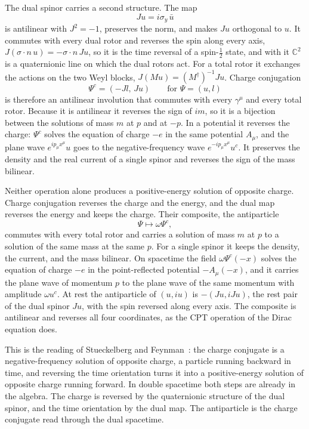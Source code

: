 \documentclass[a4paper]{article}
\begin{document}
The dual spinor carries a second structure. The map
\[
Ju=i\sigma_y\,\bar u
\]
is antilinear with $J^2=-1$, preserves the norm, and makes $Ju$ orthogonal to $u$. It commutes with every dual rotor and reverses the spin along every axis, $J(\sigma\cdot n\,u)=-\sigma\cdot n\,Ju$, so it is the time reversal of a spin-$\tfrac12$ state, and with it $\mathbb{C}^2$ is a quaternionic line on which the dual rotors act. For a total rotor it exchanges the actions on the two Weyl blocks, $J(Mu)=(M^\dagger)^{-1}Ju$. Charge conjugation
\[
\Psi^c=(-Jl,\,Ju)\qquad\text{for }\Psi=(u,l)
\]
is therefore an antilinear involution that commutes with every $\gamma^\mu$ and every total rotor. Because it is antilinear it reverses the sign of $im$, so it is a bijection between the solutions of mass $m$ at $p$ and at $-p$. In a potential it reverses the charge: $\Psi^c$ solves the equation of charge $-e$ in the same potential $A_\mu$, and the plane wave $e^{ip_\mu x^\mu}u$ goes to the negative-frequency wave $e^{-ip_\mu x^\mu}u^c$. It preserves the density and the real current of a single spinor and reverses the sign of the mass bilinear.

Neither operation alone produces a positive-energy solution of opposite charge. Charge conjugation reverses the charge and the energy, and the dual map reverses the energy and keeps the charge. Their composite, the antiparticle
\[
\Psi\mapsto\omega\Psi^c,
\]
commutes with every total rotor and carries a solution of mass $m$ at $p$ to a solution of the same mass at the same $p$. For a single spinor it keeps the density, the current, and the mass bilinear. On spacetime the field $\omega\Psi^c(-x)$ solves the equation of charge $-e$ in the point-reflected potential $-A_\mu(-x)$, and it carries the plane wave of momentum $p$ to the plane wave of the same momentum with amplitude $\omega u^c$. At rest the antiparticle of $(u,iu)$ is $-(Ju,iJu)$, the rest pair of the dual spinor $Ju$, with the spin reversed along every axis. The composite is antilinear and reverses all four coordinates, as the CPT operation of the Dirac equation does.

This is the reading of Stueckelberg and Feynman~\cite{stueckelberg1941,feynman1949}: the charge conjugate is a negative-frequency solution of opposite charge, a particle running backward in time, and reversing the time orientation turns it into a positive-energy solution of opposite charge running forward. In double spacetime both steps are already in the algebra. The charge is reversed by the quaternionic structure of the dual spinor, and the time orientation by the dual map. The antiparticle is the charge conjugate read through the dual spacetime.
\end{document}
